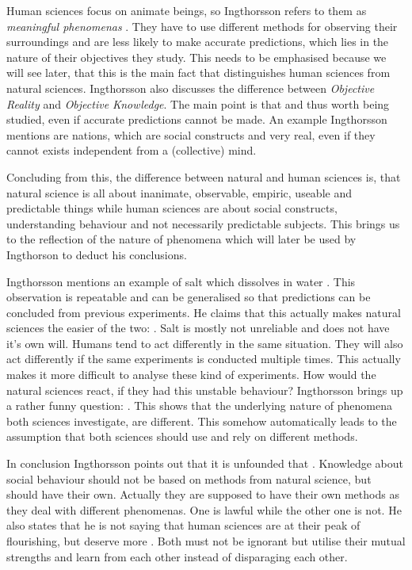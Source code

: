 \documentclass[11pt]{scrartcl}
\begin{document}
Human sciences focus on animate beings, so Ingthorsson refers to them as \textit{meaningful phenomenas} \cite[p. 27]{ingtho}. They have to use different methods for observing their surroundings and are less likely to make accurate predictions, which lies in the nature of their objectives they study. This needs to be emphasised because we will see later, that this is the main fact that distinguishes human sciences from natural sciences. Ingthorsson also discusses the difference between \textit{Objective Reality} and \textit{Objective Knowledge}. The main point is that  \cite[p. 37]{ingtho} and thus worth being studied, even if accurate predictions cannot be made. An example Ingthorsson mentions are nations, which are social constructs and very real, even if they cannot exists independent from a (collective) mind.

Concluding from this, the difference between natural and human sciences is, that natural science is all about inanimate, observable, empiric, useable and predictable things while human sciences are about social constructs, understanding behaviour and not necessarily predictable subjects. This brings us to the reflection of the nature of phenomena which will later be used by Ingthorson to deduct his conclusions.

Ingthorsson mentions an example of salt which dissolves in water \cite[p. 32]{ingtho}. This observation is repeatable and can be generalised so that predictions can be concluded from previous experiments. He claims that this actually makes natural sciences the easier of the two:  \cite[p. 32]{ingtho}. Salt is mostly not unreliable and does not have it's own will. Humans tend to act differently in the same situation. They will also act differently if the same experiments is conducted multiple times. This actually makes it more difficult to analyse these kind of experiments. How would the natural sciences react, if they had this unstable behaviour? Ingthorsson brings up a rather funny question:  \cite[p. 33]{ingtho}. This shows that the underlying nature of phenomena both sciences investigate, are different. This somehow automatically leads to the assumption that both sciences should use and rely on different methods.

In conclusion Ingthorsson points out that it is unfounded that  \cite[p. 40]{ingtho}. Knowledge about social behaviour should not be based on methods from natural science, but should have their own. Actually they are supposed to have their own methods as they deal with different phenomenas. One is lawful while the other one is not. He also states that he is not saying that human sciences are at their peak of flourishing, but deserve more  \cite[p. 41]{ingtho}. Both must not be ignorant but utilise their mutual strengths and learn from each other instead of disparaging each other.
\bigbreak
\end{document}
